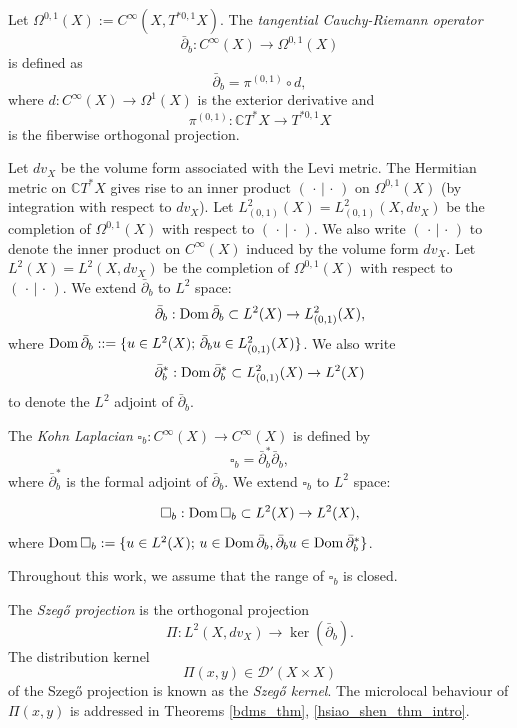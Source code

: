 \documentclass{article}
\newcommand{\CC}{\mathbb C}
\newcommand{\mcd}{\mathcal D}
\begin{document}
Let $\Omega^{0,1}(X):= C^\infty(X, T^{*0,1}X).$
%
%
The \textit{tangential Cauchy-Riemann operator} \begin{equation}\label{tcro}  \bar \partial_b : C^\infty(X) \to \Omega^{0,1}(X)\end{equation} is defined as
\begin{equation*} \bar \partial_b = \pi^{(0,1)} \circ d,\end{equation*}
where $d : C^\infty(X) \to \Omega^1(X)$ is the exterior derivative and $$\pi^{(0,1)} : \CC T^*X \to T^{*0,1}X$$ is the fiberwise orthogonal projection.


%
%
%
Let $dv_X$ be the volume form associated with the Levi metric. The Hermitian metric on $\CC T^*X$ gives rise to an inner product $(\,\cdot\,|\,\cdot\,)$ on $\Omega^{0,1}(X)$ (by integration with respect to $dv_X$). Let $L^2_{(0,1)}(X)=L^2_{(0,1)}(X, dv_X)$ be the completion of $\Omega^{0,1}(X)$ with respect to $(\,\cdot\,|\,\cdot\,)$. We also write $(\,\cdot\,|\,\cdot\,)$ to denote the inner product on $C^\infty(X)$ induced by the volume form $dv_X$. Let $L^2(X)=L^2(X, dv_X)$  be the completion of $\Omega^{0,1}(X)$ with respect to $(\,\cdot\,|\,\cdot\,)$. We extend $\bar\partial_b$ to $L^2$ space:
\[\bar\partial_b: {\rm Dom\,}\bar\partial_b\subset L^2(X)\rightarrow L^2_{(0,1)}(X),\]
where ${\rm Dom\,}\bar\partial_b::=\{u\in L^2(X);\, \bar\partial_bu\in L^2_{(0,1)}(X)\}$. We also write 
\[\bar\partial^*_b: {\rm Dom\,}\bar\partial^*_b\subset L^2_{(0,1)}(X)\rightarrow L^2(X)\]
to denote the $L^2$ adjoint of $\bar\partial_b$.

The \textit{Kohn Laplacian} $\square_b : C^\infty(X) \to C^\infty(X)$ is defined by $$\square_b = \bar \partial_b^* \bar \partial_b,$$ where $\bar \partial_b^*$ is the formal adjoint of $\bar \partial_b$. We extend $\square_b$ to $L^2$ space:

\[\square_b: {\rm Dom\,}\square_b\subset L^2(X)\rightarrow L^2(X),\]
where ${\rm Dom\,}\square_b:=\{u\in L^2(X);\, u\in{\rm Dom\,}\bar\partial_b, \bar\partial_bu\in{\rm Dom\,}\bar\partial^*_b\}$.


Throughout this work, we assume that the range of $\square_b$ is closed.

The \textit{Szeg\H{o} projection} is the orthogonal projection $$\Pi : L^2(X, dv_X) \to \ker(\bar \partial_b).$$ The distribution kernel $$\Pi(x,y) \in \mcd'(X \times X)$$ of the Szeg\H{o} projection is known as the \textit{Szeg\H{o} kernel}. The microlocal behaviour of $\Pi(x,y)$ is addressed in Theorems \ref{bdms_thm}, \ref{hsiao_shen_thm_intro}.
%
%
%
%
%
\end{document}
